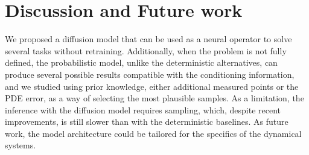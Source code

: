 \documentclass{article}
\begin{document}
\section{Discussion and Future work}

We proposed a diffusion model that can be used as a neural operator to solve several tasks without retraining. Additionally, when the problem is not fully defined, the probabilistic model, unlike the deterministic alternatives, can produce several possible results compatible with the conditioning information, and we studied using  prior knowledge, either additional measured points or the PDE error, as a way of selecting the most plausible samples. 
As a limitation, the inference with the diffusion model requires sampling, which, despite recent improvements, is still slower than with the deterministic baselines. As future work, the model architecture could be tailored for the specifics of the dynamical systems.






\small

\end{document}

